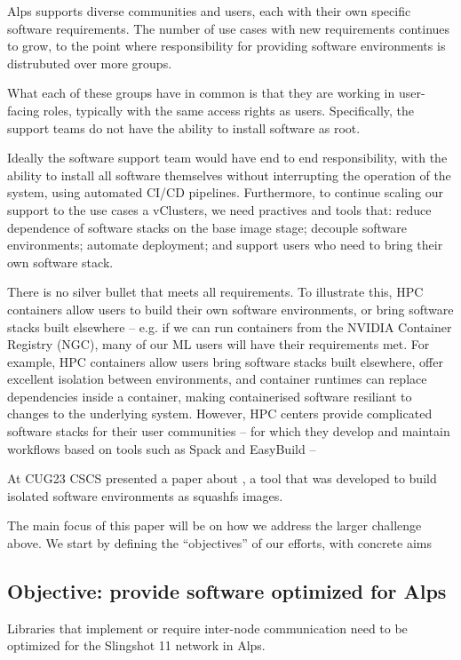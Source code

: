 Alps supports diverse communities and users, each with their own specific software requirements.
The number of use cases with new requirements continues to grow, to the point where responsibility for providing software environments is distrubuted over more groups.

What each of these groups have in common is that they are working in user-facing roles, typically with the same access rights as users. Specifically, the support teams do not have the ability to install software as root.

Ideally the software support team would have end to end responsibility, with the ability to install all software themselves without interrupting the operation of the system, using automated CI/CD pipelines.
Furthermore, to continue scaling our support to the use cases a vClusters, we need practives and tools that: reduce dependence of software stacks on the base image stage; decouple software environments; automate deployment; and support users who need to bring their own software stack.

There is no silver bullet that meets all requirements.
To illustrate this, HPC containers allow users to build their own software environments, or bring software stacks built elsewhere -- e.g. if we can run containers from the NVIDIA Container Registry (NGC), many of our ML users will have their requirements met.
For example, HPC containers allow users bring software stacks built elsewhere, offer excellent isolation between environments, and container runtimes can replace dependencies inside a container, making containerised software resiliant to changes to the underlying system.
However, HPC centers provide complicated software stacks for their user communities -- for which they develop and maintain workflows based on tools such as Spack and EasyBuild -- 

At CUG23 CSCS presented a paper about \stackinator, a tool that was developed to build isolated software environments as squashfs images.

The main focus of this paper will be on how we address the larger challenge above.
We start by defining the ``objectives'' of our efforts, with concrete aims 

\subsection{Objective: provide software optimized for Alps}

Libraries that implement or require inter-node communication need to be optimized for the Slingshot 11 network in Alps.


